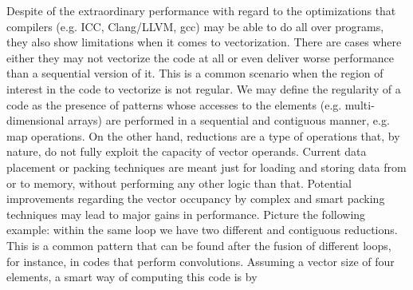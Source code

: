 Despite of the extraordinary performance with regard to the optimizations that
compilers (e.g. ICC, Clang/LLVM, gcc) may be able to do all over programs, they 
also
show limitations when it comes to vectorization. There are cases where either
they may not vectorize the code at all or even deliver worse performance than a
sequential version of it. This is a common scenario when the region of interest
in the code to vectorize is not regular. We may define the regularity of a code
as the presence of patterns whose accesses to the elements (e.g.
multi-dimensional arrays) are performed in a sequential and contiguous manner,
e.g. map operations. On the other hand, reductions are a type of operations
that, by nature,
do not fully exploit the capacity of vector operands. Current data placement or
packing techniques are meant just for loading and storing data from or to
memory, without performing any other logic than that. Potential improvements
regarding the vector occupancy by complex and smart packing techniques may lead
to major gains in performance. Picture the following example: within the same
loop we have two different and contiguous reductions. This is a common pattern
that can be found after the fusion of different loops, for instance, in codes
that perform convolutions. Assuming a vector size of four elements, a smart way
of computing this code is by


